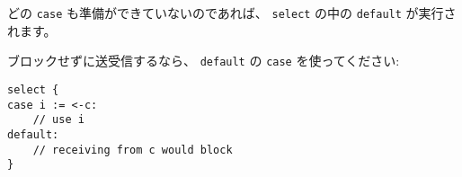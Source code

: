 どの \texttt{case} も準備ができていないのであれば、
\texttt{select} の中の \texttt{default} が実行されます。

ブロックせずに送受信するなら、 \texttt{default} の \texttt{case} を使ってください:

\begin{lstlisting}[numbers=none]
select {
case i := <-c:
    // use i
default:
    // receiving from c would block
}
\end{lstlisting}